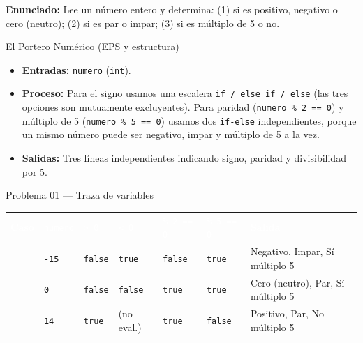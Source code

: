 \documentclass[11pt,letterpaper]{article}
\begin{document}
\textbf{Enunciado:} Lee un número entero y determina: (1) si es positivo, negativo o cero (neutro); (2) si es par o impar; (3) si es múltiplo de 5 o no.

\begin{analisis}{El Portero Numérico (EPS y estructura)}
\begin{itemize}
  \item \textbf{Entradas:} \texttt{numero} (\texttt{int}).
  \item \textbf{Proceso:} Para el signo usamos una escalera \texttt{if / else if / else} (las tres opciones son mutuamente excluyentes). Para paridad (\texttt{numero \% 2 == 0}) y múltiplo de 5 (\texttt{numero \% 5 == 0}) usamos dos \texttt{if-else} independientes, porque un mismo número puede ser negativo, impar y múltiplo de 5 a la vez.
  \item \textbf{Salidas:} Tres líneas independientes indicando signo, paridad y divisibilidad por 5.
\end{itemize}
\end{analisis}






\begin{pruebaescritorio}{Problema 01 --- Traza de variables}
\footnotesize
\renewcommand{\arraystretch}{1.22}
\begin{tabularx}{\linewidth}{>{\centering\arraybackslash}p{1.2cm} >{\centering\arraybackslash}p{1.4cm} >{\centering\arraybackslash}p{1.6cm} >{\centering\arraybackslash}p{1.6cm} >{\centering\arraybackslash}p{2.0cm} >{\centering\arraybackslash}p{2.0cm} X}
  \rowcolor{AzulMarino}
  \textcolor{white}{\textbf{Caso}} & \textcolor{white}{\texttt{numero}} & \textcolor{white}{\texttt{> 0}} & \textcolor{white}{\texttt{< 0}} & \textcolor{white}{\texttt{\% 2 == 0}} & \textcolor{white}{\texttt{\% 5 == 0}} & \textcolor{white}{\textbf{Salida}} \\
  1 & \texttt{-15} & \texttt{false} & \texttt{true} & \texttt{false} & \texttt{true} & Negativo, Impar, Sí múltiplo 5 \\
  2 & \texttt{0} & \texttt{false} & \texttt{false} & \texttt{true} & \texttt{true} & Cero (neutro), Par, Sí múltiplo 5 \\
  3 & \texttt{14} & \texttt{true} & (no eval.) & \texttt{true} & \texttt{false} & Positivo, Par, No múltiplo 5 \\
  \bottomrule
\end{tabularx}
\end{pruebaescritorio}
\end{document}

